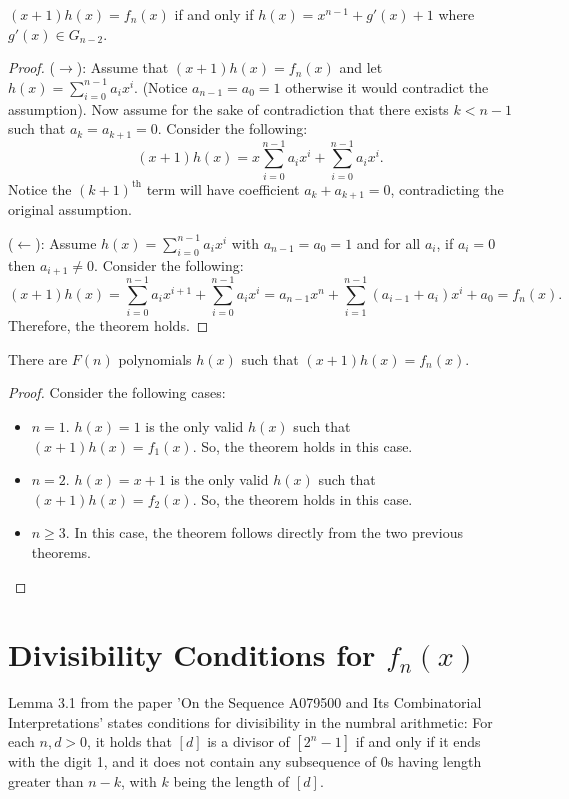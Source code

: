     \begin{theorem}
        $(x+1)h(x) = f_n(x)$ if and only if $h(x) = x^{n-1} + g'(x)+1$ where $g'(x) \in G_{n-2}$.
    \end{theorem}
    \begin{proof}
        ($\rightarrow$): Assume that $(x+1)h(x) = f_n(x)$ and let $h(x) = \sum_{i=0}^{n-1} a_i x^i$.
        (Notice $a_{n-1} = a_0 = 1$ otherwise it would contradict the assumption). Now assume
        for the sake of contradiction that there exists $k < n-1$ such that $a_k = a_{k+1} = 0$.
        Consider the following:
        $$(x+1)h(x) = x \sum_{i=0}^{n-1} a_i x^i + \sum_{i=0}^{n-1} a_i x^i.$$
        Notice the $(k+1)^{\text{th}}$ term will have coefficient $a_k + a_{k+1} = 0$,
        contradicting the original assumption.

        ($\leftarrow$): Assume $h(x) = \sum_{i=0}^{n-1} a_i x^i$ with $a_{n-1} = a_0 = 1$ and for
        all $a_i$, if $a_i=0$ then $a_{i+1} \neq 0$. Consider the following:
        $$(x+1)h(x) = \sum_{i=0}^{n-1} a_i x^{i+1} + \sum_{i=0}^{n-1} a_i x^i = a_{n-1}x^n + \sum_{i=1}^{n-1}(a_{i-1}+a_i)x^i + a_0 = f_n(x).$$
        Therefore, the theorem holds.
    \end{proof}

    \begin{theorem}
        There are $F(n)$ polynomials $h(x)$ such that $(x+1)h(x) = f_n(x)$.
    \end{theorem}
    \begin{proof}
        Consider the following cases:
        \begin{itemize}
            \item $n = 1$. $h(x) = 1$ is the only valid $h(x)$ such that $(x+1)h(x) = f_1(x)$.
            So, the theorem holds in this case.
            \item $n = 2$. $h(x) = x+1$ is the only valid $h(x)$ such that $(x+1)h(x) = f_2(x)$.
            So, the theorem holds in this case.
            \item $n \geq 3$. In this case, the theorem follows directly from the two previous theorems.
        \end{itemize}
    \end{proof}

    \section{Divisibility Conditions for $f_n(x)$}
    \begin{lemma}
        Lemma 3.1 from the paper 'On the Sequence A079500 and Its Combinatorial Interpretations'
        states conditions for divisibility in the numbral arithmetic: For each $n, d > 0$,
        it holds that $[d]$ is a divisor of $[2^n - 1]$ if and only if it ends with the digit 1,
        and it does not contain any subsequence of 0s having length greater than $n-k$, with $k$
        being the length of $[d]$.
    \end{lemma}

